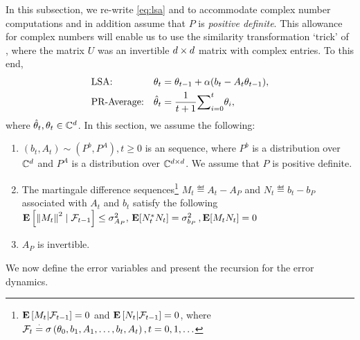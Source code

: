 In this subsection, we re-write \eqref{eq:lsa} and  to accommodate complex number computations and in addition assume that $P$ is \emph{positive definite}. This allowance for complex numbers will enable us to use the similarity transformation `trick' of , where the matrix $U$ was an invertible $d \times d$ matrix with complex entries. To this end,
\begin{subequations}\label{eq:lsacmplx}
\begin{align}
\label{conststepapp}&\text{LSA:} &\theta_t&=\theta_{t-1}+\alpha(b_t-A_t\theta_{t-1}),\\
\label{iteravgapp}&\text{PR-Average:} &\hat{\theta}_t&=\frac{1}{t+1}{\sum}_{i=0}^{t}\theta_i,
\end{align}
\end{subequations}
where $\hat{\theta}_t, \theta_t \in \mathbb{C}^{d}$. In this section, we assume the following: 
\begin{assumption}\label{assmp:lsacmplx}
\begin{enumerate}[leftmargin=*, before = \leavevmode\vspace{-\baselineskip}]
\item \label{distapp} $(b_t, A_t)\sim (P^b,P^A), t\geq 0$ is an \iid sequence, where $P^b$ is a distribution over $\mathbb{C}^d$ and $P^A$ is a distribution over $\mathbb{C}^{d \times d}$. We assume that $P$ is positive definite.
\item \label{matvarapp} The martingale difference sequences\footnote{$\mathbf{E}\left[M_t|\mathcal{F}_{t-1}\right]=0$ and $\mathbf{E}\left[N_t|\mathcal{F}_{t-1}\right]=0$, where $\mathcal{F}_t\stackrel{\cdot}{=} \sigma\left(\theta_0,b_1,A_1,\ldots,b_t,A_t\right), t=0,1,\ldots$} $M_t\eqdef A_t-A_{P}$ and $N_t\eqdef b_t-b_{P}$ associated with $A_t$ and $b_t$ satisfy the following
$\mathbf{E}\left[ \left\| M_t\right\|^2\mid\mathcal{F}_{t-1}\right]\leq \sigma^2_{A_P}, \, \mathbf{E}[N_t^* N_t]=\sigma^2_{b_P}\,, \mathbf{E}[M_tN_t]=0$
\item $A_P$ is invertible.
\end{enumerate}
\end{assumption}
We now define the error variables and present the recursion for the error dynamics. 
